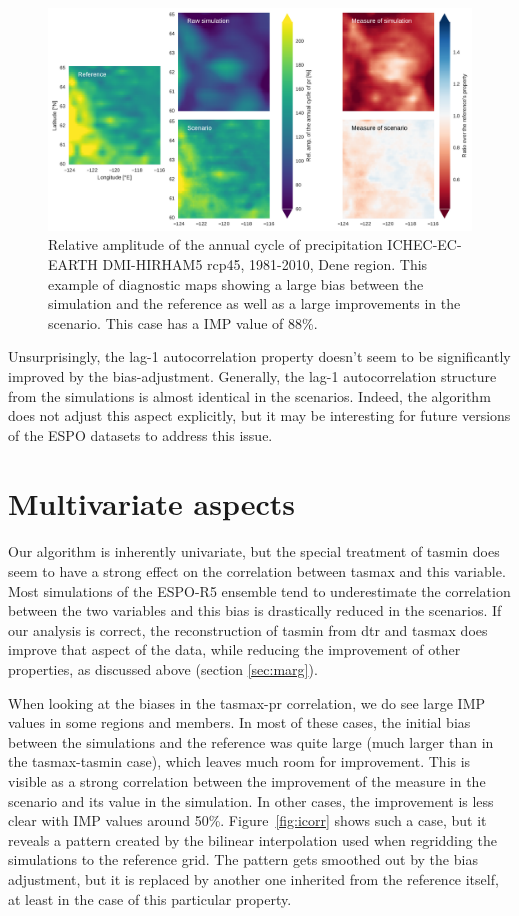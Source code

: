 \documentclass[letterpaper,10pt]{article}
\begin{document}
\begin{figure}
\includegraphics[width=\textwidth]{../images/aca_pr_diags.pdf}
\caption{Relative amplitude of the annual cycle of precipitation ICHEC-EC-EARTH DMI-HIRHAM5 rcp45, 1981-2010, Dene region. This example of diagnostic maps showing a large bias between the simulation and the reference as well as a large improvements in the scenario. This case has a IMP value of 88\%.}\label{fig:acapr}
\end{figure}

Unsurprisingly, the lag-1 autocorrelation property doesn't seem to be significantly improved by the bias-adjustment.
Generally, the lag-1 autocorrelation structure from the simulations is almost identical in the scenarios.
Indeed, the algorithm does not adjust this aspect explicitly, but it may be interesting for future versions of the ESPO datasets to address this issue.

\section{Multivariate aspects}
Our algorithm is inherently univariate, but the special treatment of tasmin does seem to have a strong effect on the correlation between tasmax and this variable.
Most simulations of the ESPO-R5 ensemble tend to underestimate the correlation between the two variables and this bias is drastically reduced in the scenarios.
If our analysis is correct, the reconstruction of tasmin from dtr and tasmax does improve that aspect of the data, while reducing the improvement of other properties, as discussed above (section \ref{sec:marg}).

When looking at the biases in the tasmax-pr correlation, we do see large IMP values in some regions and members.
In most of these cases, the initial bias between the simulations and the reference was quite large (much larger than in the tasmax-tasmin case), which leaves much room for improvement.
This is visible as a strong correlation between the improvement of the measure in the scenario and its value in the simulation.
In other cases, the improvement is less clear with IMP values around 50\%.
Figure~\ref{fig:icorr} shows such a case, but it reveals a pattern created by the bilinear interpolation used when regridding the simulations to the reference grid.
The pattern gets smoothed out by the bias adjustment, but it is replaced by another one inherited from the reference itself, at least in the case of this particular property.
\end{document}
